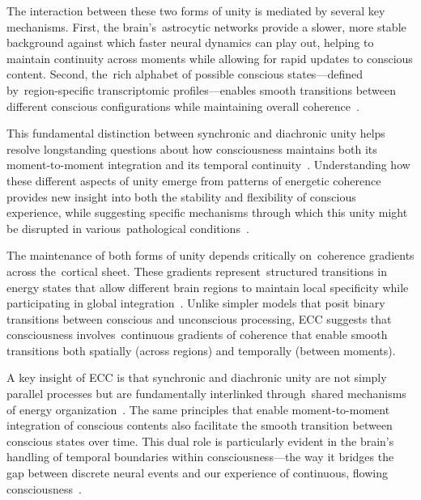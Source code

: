 The interaction between these two forms of unity is mediated by several key mechanisms. First, the brain's~astrocytic networks provide a slower, more stable background against which faster neural dynamics can play out, helping to maintain continuity across moments while allowing for rapid updates to conscious content. Second, the~rich alphabet of possible conscious states—defined by~region-specific transcriptomic profiles—enables smooth transitions between different conscious configurations while maintaining overall coherence~\cite{siletti2023transcriptomic, bakken2021comparative}.

This fundamental distinction between synchronic and diachronic unity helps resolve longstanding questions about how consciousness maintains both its moment-to-moment integration and its temporal continuity~\cite{bosl2025dynamical}. Understanding how these different aspects of unity emerge from patterns of energetic coherence provides new insight into both the stability and flexibility of conscious experience, while suggesting specific mechanisms through which this unity might be disrupted in various~pathological conditions~\cite{da2024mathematical}.

The maintenance of both forms of unity depends critically on~coherence gradients across the~cortical sheet. These gradients represent~structured transitions in energy states that allow different brain regions to maintain local specificity while participating in global integration~\cite{freeman2007, breakspear2005dynamics}. Unlike simpler models that posit binary transitions between conscious and unconscious processing, ECC suggests that consciousness involves~continuous gradients of coherence that enable smooth transitions both spatially (across regions) and temporally (between moments).

A key insight of ECC is that synchronic and diachronic unity are not simply parallel processes but are fundamentally interlinked through~shared mechanisms of energy organization~\cite{kelso2012}. The same principles that enable moment-to-moment integration of conscious contents also facilitate the smooth transition between conscious states over time. This dual role is particularly evident in the brain's handling of temporal boundaries within consciousness—the way it bridges the gap between discrete neural events and our experience of continuous, flowing consciousness~\cite{amil2024theta}.

